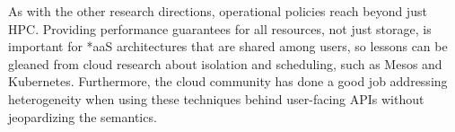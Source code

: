 \documentclass{sig-alternate}
\begin{document}
As with the other research directions, operational policies reach beyond just
HPC. Providing performance guarantees for all resources, not just storage, is
important for *aaS architectures that are shared among users, so lessons can be
gleaned from cloud research about isolation and scheduling, such as Mesos and
Kubernetes. Furthermore, the cloud community has done a good job addressing
heterogeneity when using these techniques behind user-facing APIs without
jeopardizing the semantics.

%

\end{document}
